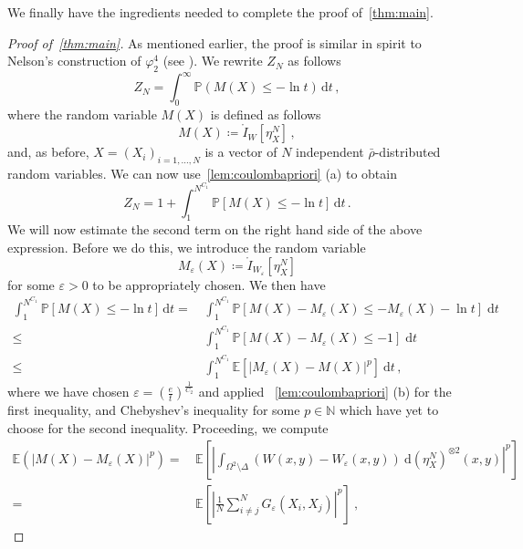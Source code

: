 \documentclass[a4paper,10pt,twoside]{amsart}
\theoremstyle{remark}
\theoremstyle{definition}
\numberwithin{equation}{section}
\newcommand{\eps}{\varepsilon}
\newcommand{\N}{\mathbb{N}}
\newcommand{\0}{{\bf 0}}
\newcommand{\+}{\hspace{-.5ex}+\hspace{-.5ex}}
\begin{document}
We finally have the ingredients needed to complete the proof of~\cref{thm:main}.
\begin{proof}[Proof of~\cref{thm:main}]
  As mentioned earlier, the proof is similar in spirit to Nelson's construction of $\varphi^4_2$ (see \cite{hairer2021introduction}). We rewrite $Z_{N}$ as follows
  \begin{equation}
  Z_{N} = 
  \int_0^\infty \mathbb{P}(M(X) \leq -\ln t)\, \mathrm{d}t \, , 
  \end{equation}
  where the random variable $M(X)$ is defined as follows
  \begin{equation}
     M(X) \coloneqq \mathring{I}_{W}[\eta^N_X] \, ,
  \end{equation}
  and, as before, $X=(X_i)_{i=1,\dots,N}$ is a vector of $N$ independent $\bar\rho$-distributed random variables. We can now use~\cref{lem:coulombapriori} (a) to obtain
\begin{equation}
Z_{N} = 1+ \int_1^{N^{C_1}} \mathbb{P}[M(X) \leq -\ln t]\, \mathrm{d}t\, .
\end{equation}
We will now estimate the second term on the right hand side of the above expression. Before we do this, we introduce the random variable
\begin{equation}
  M_{\eps}(X)\coloneqq \mathring{I}_{W_\eps}[\eta^N_X]
\end{equation}
for some $\eps>0$ to be appropriately chosen. We then have
\begin{align}
\int_1^{N^{C_1}} \mathbb{P}[M(X) \leq -\ln t]\, \mathrm{d}t 
=& \,\int_{1}^{N^{C_{1}}}\mathbb{{P}}[M(X)-M_{\eps}(X)\leq-M_{\eps}(X)-\ln t]\;\mathrm{{d}}t\\
\leq & \, \int_{1}^{N^{C_{1}}}\mathbb{{P}}[M(X)-M_{\eps}(X)\leq-1]\;\mathrm{{d}}t\\
\leq& \,\int_{1}^{N^{C_{1}}}\mathbb{{E}}[|M_{\eps}(X)-M(X)|^{p}]\:\mathrm{{d}}t\,, \label{eq:timeintegral}
\end{align}
where we have chosen $\eps=(\frac{e}{t})^{\frac{1}{C_2}}$ and applied ~\cref{lem:coulombapriori} (b) for the first inequality, and Chebyshev's inequality for some $p \in \N$ which have yet to choose for the second inequality. Proceeding, we compute
\begin{align}
\mathbb{{E}}(|M(X)-M_\eps(X)|^{p})= & \, \mathbb{{E}}\left[\left|\int_{\Omega^{2}\setminus\Delta}(W(x,y)-W_{\eps}(x,y))\:\mathrm{{d}}(\eta_{X}^{N})^{\otimes2}(x,y)\right|^{p}\right]\\
=& \, \mathbb{{E}}\left[\left|\frac{1}{N}\sum_{i\neq j}^{N}G_{\eps}(X_{i},X_{j})\right|^{p}\right]\:, \label{eq:intermezzo}

\end{align}
\end{proof}
\end{document}

